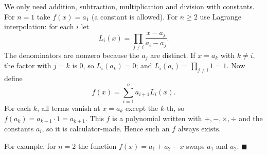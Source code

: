 We only need addition, subtraction, multiplication and division with constants. For $n=1$ take $f(x)=a_1$ (a constant is allowed). For $n\ge2$ use Lagrange interpolation: for each $i$ let
\[
L_i(x)=\prod_{j\ne i}\dfrac{x-a_j}{a_i-a_j}.
\]
The denominators are nonzero because the $a_j$ are distinct. If $x=a_k$ with $k\ne i$, the factor with $j=k$ is $0$, so $L_i(a_k)=0$; and $L_i(a_i)=\prod_{j\ne i}1=1$. Now define
\[
f(x)=\sum_{i=1}^{n}a_{i+1}L_i(x).
\]
For each $k$, all terms vanish at $x=a_k$ except the $k$-th, so $f(a_k)=a_{k+1}\cdot1=a_{k+1}$. This $f$ is a polynomial written with $+,-,\times,\div$ and the constants $a_i$, so it is calculator-made. Hence $\boxed{\text{such an }f\text{ always exists}}$.

For example, for $n=2$ the function $f(x)=a_1+a_2-x$ swaps $a_1$ and $a_2$. $\blacksquare$
